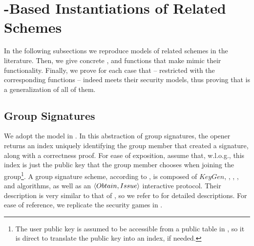 \section{\UAS-Based Instantiations of Related Schemes}
\label{app:related-models}

In the following subsections we reproduce models of related schemes in the
literature. Then, we give concrete \fissue, \feval and \finsp functions that
make \UAS mimic their functionality. Finally, we prove for each case that
\UAS -- restricted with the corresponding functions -- indeed meets their
security models, thus proving that \UAS is a generalization of all of them.

\subsection{Group Signatures}
\label{sapp:related-models-gs}

We adopt the model in \cite{bsz05}. In this abstraction
of group signatures, the opener returns an index uniquely identifying the group
member that created a signature, along with a correctness proof. For ease of
exposition, assume that, w.l.o.g., this index is just the public key that the
group member chooses when joining the group\footnote{The user public key is
  assumed to be accessible from a public table in \cite{bsz05}, so it is direct
  to translate the public key into an index, if needed.}. A group signature
scheme, according to \cite{bsz05}, is composed of $KeyGen$, \UKeyGen, \Sign,
\Verify, \Open and \Judge algorithms, as well as an $\langle Obtain,Issue
\rangle$ interactive protocol. Their description is very similar to that of
\GSAC, so we refer to \cite{bsz05} for detailed descriptions. For ease of
reference, we replicate the security games in .

